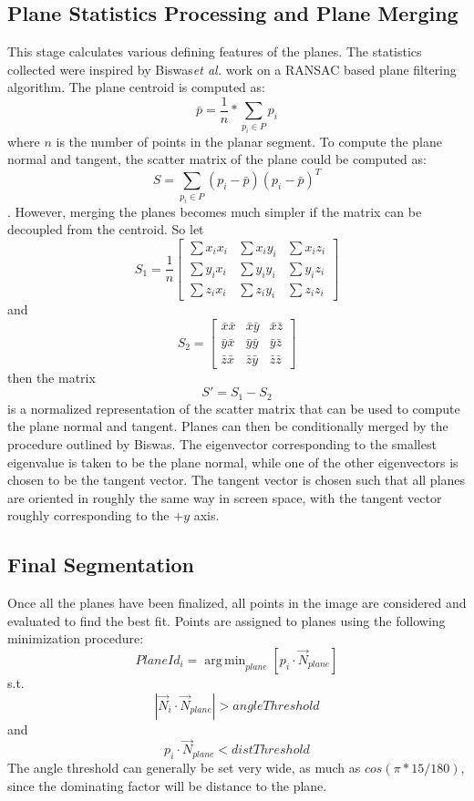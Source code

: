 \subsection{Plane Statistics Processing and Plane Merging}
This stage calculates various defining features of the planes. The statistics collected were inspired by Biswas\textit{et al.} work on a RANSAC based plane filtering algorithm\cite{biswas2012planar}. The plane centroid is computed as: $$\bar{p}=\frac{1}{n}*\sum_{p_i \in P}{p_i}$$ where $n$ is the number of points in the planar segment. To compute the plane normal and tangent, the scatter matrix of the plane could be computed as: $$S = \sum_{p_i \in P}(p_i-\bar{p})(p_i-\bar{p})^T$$.
However, merging the planes becomes much simpler if the matrix can be decoupled from the centroid\cite{biswas2012planar}. So let 
$$S_1 = \frac{1}{n}\begin{bmatrix}
  \sum{x_i x_i} & \sum{x_i y_i} & \sum{x_i z_i} \\
  \sum{y_i x_i} & \sum{y_i y_i} & \sum{y_i z_i} \\
  \sum{z_i x_i} & \sum{z_i y_i} & \sum{z_i z_i}
 \end{bmatrix}$$
and
 $$S_2 = \begin{bmatrix}
  \bar{x}\bar{x} & \bar{x}\bar{y} & \bar{x}\bar{z} \\
  \bar{y}\bar{x} & \bar{y}\bar{y} & \bar{y}\bar{z} \\
  \bar{z}\bar{x} & \bar{z}\bar{y} & \bar{z}\bar{z}
 \end{bmatrix}$$
then the matrix
 $$S'=S_1-S_2$$
is a normalized representation of the scatter matrix that can be used to compute the plane normal and tangent. Planes can then be conditionally merged by the procedure outlined by Biswas\cite{biswas2012planar}. 
The eigenvector corresponding to the smallest eigenvalue is taken to be the plane normal, while one of the other eigenvectors is chosen to be the tangent vector. The tangent vector is chosen such that all planes are oriented in roughly the same way in screen space, with the tangent vector roughly corresponding to the $+y$ axis.
\subsection{Final Segmentation}
Once all the planes have been finalized, all points in the image are considered and evaluated to find the best fit. Points are assigned to planes using the following minimization procedure:
$$PlaneId_i = \operatorname{arg\,min}_{plane} [ p_i \cdot \vec{N}_{plane} ]$$ s.t. $$|\vec{N}_i \cdot \vec{N}_{plane}| > angleThreshold$$ and $$p_i \cdot \vec{N}_{plane} < distThreshold$$
The angle threshold can generally be set very wide, as much as $cos(\pi*15/180)$, since the dominating factor will be distance to the plane.
